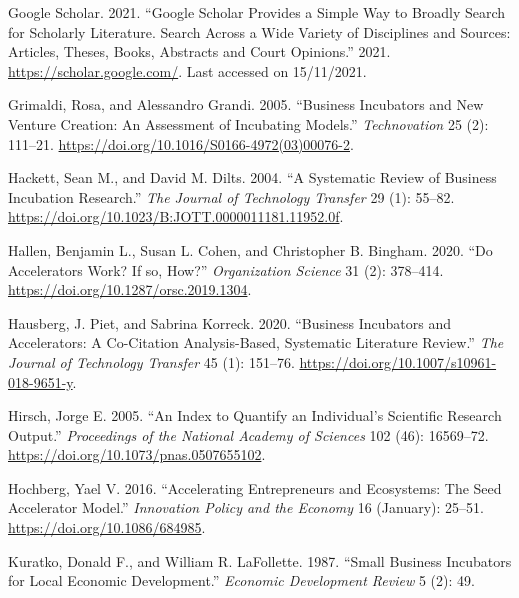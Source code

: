 \documentclass[
  12pt,
]{article}
\newlength{\cslhangindent}
\newlength{\cslentryspacingunit} %
\newenvironment{CSLReferences}[2] %
 {%
  \setlength{\parindent}{0pt}
  \ifodd #1
  \let\oldpar\par
  \def\par{\hangindent=\cslhangindent\oldpar}
  \fi
  \setlength{\parskip}{#2\cslentryspacingunit}
 }%
 {}
\begin{document}
\begin{CSLReferences}{1}{0}
\leavevmode{}%
Google Scholar. 2021. {``Google Scholar Provides a Simple Way to Broadly Search for Scholarly Literature. Search Across a Wide Variety of Disciplines and Sources: Articles, Theses, Books, Abstracts and Court Opinions.''} 2021. \url{https://scholar.google.com/}. Last accessed on 15/11/2021.

\leavevmode{}%
Grimaldi, Rosa, and Alessandro Grandi. 2005. {``Business Incubators and New Venture Creation: An Assessment of Incubating Models.''} \emph{Technovation} 25 (2): 111--21. \url{https://doi.org/10.1016/S0166-4972(03)00076-2}.

\leavevmode{}%
Hackett, Sean M., and David M. Dilts. 2004. {``A Systematic Review of Business Incubation Research.''} \emph{The Journal of Technology Transfer} 29 (1): 55--82. \url{https://doi.org/10.1023/B:JOTT.0000011181.11952.0f}.

\leavevmode{}%
Hallen, Benjamin L., Susan L. Cohen, and Christopher B. Bingham. 2020. {``Do Accelerators Work? If so, How?''} \emph{Organization Science} 31 (2): 378--414. \url{https://doi.org/10.1287/orsc.2019.1304}.

\leavevmode{}%
Hausberg, J. Piet, and Sabrina Korreck. 2020. {``Business Incubators and Accelerators: A Co-Citation Analysis-Based, Systematic Literature Review.''} \emph{The Journal of Technology Transfer} 45 (1): 151--76. \url{https://doi.org/10.1007/s10961-018-9651-y}.

\leavevmode{}%
Hirsch, Jorge E. 2005. {``An Index to Quantify an Individual's Scientific Research Output.''} \emph{Proceedings of the National Academy of Sciences} 102 (46): 16569--72. \url{https://doi.org/10.1073/pnas.0507655102}.

\leavevmode{}%
Hochberg, Yael V. 2016. {``Accelerating Entrepreneurs and Ecosystems: The Seed Accelerator Model.''} \emph{Innovation Policy and the Economy} 16 (January): 25--51. \url{https://doi.org/10.1086/684985}.

\leavevmode{}%
Kuratko, Donald F., and William R. LaFollette. 1987. {``Small Business Incubators for Local Economic Development.''} \emph{Economic Development Review} 5 (2): 49.


\end{CSLReferences}
\end{document}
